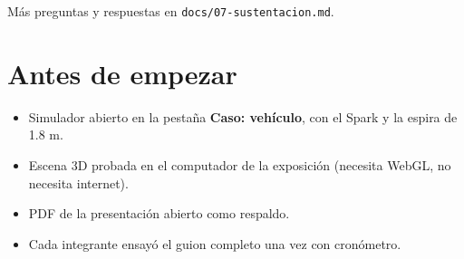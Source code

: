 \documentclass[11pt,a4paper]{article}
\begin{document}
Más preguntas y respuestas en \texttt{docs/07-sustentacion.md}.

\section*{Antes de empezar}

\begin{itemize}[leftmargin=1.2em, itemsep=2pt]
 \item[$\square$] Simulador abierto en la pestaña \textbf{Caso: vehículo}, con el Spark y la espira de 1.8 m.
 \item[$\square$] Escena 3D probada en el computador de la exposición (necesita WebGL, no necesita internet).
 \item[$\square$] PDF de la presentación abierto como respaldo.
 \item[$\square$] Cada integrante ensayó el guion completo una vez con cronómetro.
\end{itemize}
\end{document}
